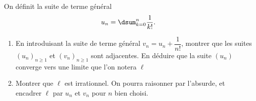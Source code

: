 On définit la suite de terme général
$$
u_n=\dsum_{k=0}^n\dfrac{1}{k!}.
$$
\begin{enumerate}
\item En introduisant la suite de terme général $v_n=u_n+\dfrac1{n!}$, montrer que les suites $\left(u_n\right)_{n\geq1}$ et $\left(v_n\right)_{n\geq1}$ sont adjacentes. En déduire que la suite $\left(u_n\right)$ converge vers une limite que l'on notera $\ell$
\item Montrer que $\ell$ est irrationnel. On pourra raisonner par l'absurde, et encadrer $\ell$ par $u_n$ et $v_n$ pour $n$ bien choisi.
\end{enumerate}
